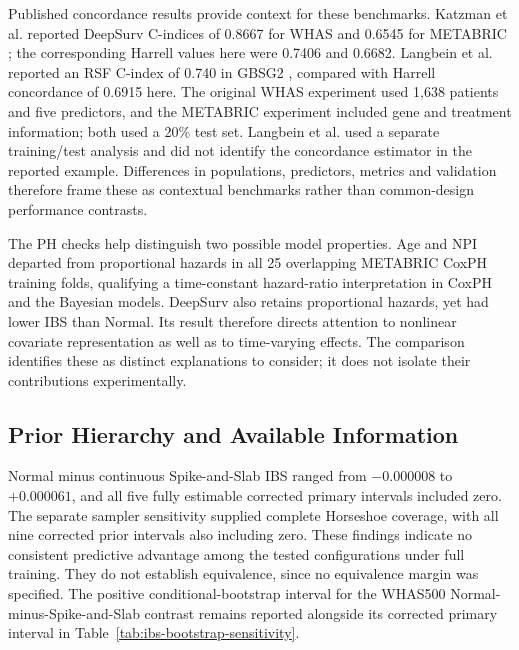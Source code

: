 Published concordance results provide context for these benchmarks. Katzman et al. reported DeepSurv C-indices of 0.8667 for WHAS and 0.6545 for METABRIC \cite{ref4}; the corresponding Harrell values here were 0.7406 and 0.6682. Langbein et al. reported an RSF C-index of 0.740 in GBSG2 \cite{ref61}, compared with Harrell concordance of 0.6915 here. The original WHAS experiment used 1,638 patients and five predictors, and the METABRIC experiment included gene and treatment information; both used a 20\% test set. Langbein et al. used a separate training/test analysis and did not identify the concordance estimator in the reported example. Differences in populations, predictors, metrics and validation therefore frame these as contextual benchmarks rather than common-design performance contrasts.

The PH checks help distinguish two possible model properties. Age and NPI departed from proportional hazards in all 25 overlapping METABRIC CoxPH training folds, qualifying a time-constant hazard-ratio interpretation in CoxPH and the Bayesian models. DeepSurv also retains proportional hazards, yet had lower IBS than Normal. Its result therefore directs attention to nonlinear covariate representation as well as to time-varying effects. The comparison identifies these as distinct explanations to consider; it does not isolate their contributions experimentally.

\subsection{Prior Hierarchy and Available Information}\label{did-one-bayesian-prior-dominate}

Normal minus continuous Spike-and-Slab IBS ranged from $-0.000008$ to $+0.000061$, and all five fully estimable corrected primary intervals included zero. The separate sampler sensitivity supplied complete Horseshoe coverage, with all nine corrected prior intervals also including zero. These findings indicate no consistent predictive advantage among the tested configurations under full training. They do not establish equivalence, since no equivalence margin was specified. The positive conditional-bootstrap interval for the WHAS500 Normal-minus-Spike-and-Slab contrast remains reported alongside its corrected primary interval in Table~\ref{tab:ibs-bootstrap-sensitivity}.


